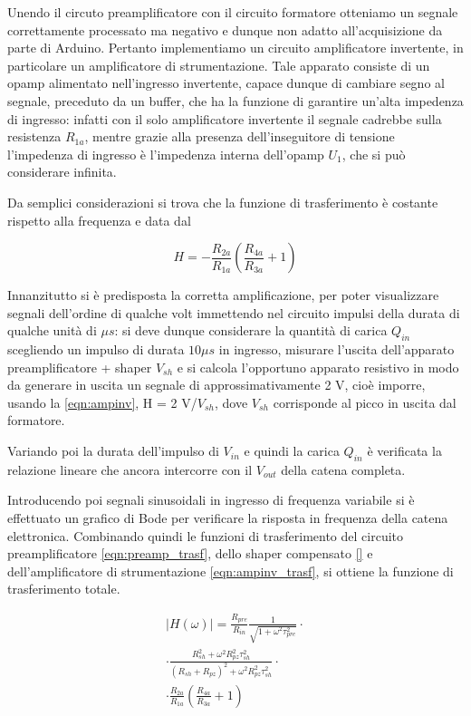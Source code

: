 \documentclass{article}
\begin{document}
Unendo il circuto preamplificatore con il circuito formatore otteniamo un segnale correttamente processato ma negativo e dunque non
adatto all'acquisizione da parte di Arduino. Pertanto implementiamo un circuito amplificatore invertente, in particolare un
amplificatore di strumentazione. Tale apparato consiste di un opamp alimentato nell'ingresso invertente, capace dunque di cambiare
segno al segnale, preceduto da un buffer, che ha la funzione di garantire un'alta impedenza di ingresso: infatti con il solo 
amplificatore invertente il segnale cadrebbe sulla resistenza $R_{1a}$, mentre grazie alla presenza dell'inseguitore di tensione 
l'impedenza di ingresso è l'impedenza interna dell'opamp $U_1$, che si può considerare infinita.

Da semplici considerazioni si trova che la funzione di trasferimento è costante rispetto alla frequenza e data dal

\begin{equation}
    \label{eqn:ampinv_trasf}
    H = - \frac{R_{2a}}{R_{1a}} \left( \frac{R_{4a}}{R_{3a}} + 1 \right)
\end{equation}

Innanzitutto si è predisposta la corretta amplificazione, per poter visualizzare segnali dell'ordine di qualche volt immettendo
nel circuito impulsi della durata di qualche unità di $\mu s$: si deve dunque considerare la quantità di carica $Q_{in}$ 
scegliendo un impulso di durata $10 \mu s$ in ingresso, misurare l'uscita dell'apparato preamplificatore + shaper $V_{sh}$ 
e si calcola l'opportuno apparato resistivo in modo da generare in uscita un segnale di approssimativamente 2 V, cioè imporre, usando
la \ref{eqn:ampinv}, H = 2 V/$V_{sh}$, dove $V_{sh}$ corrisponde al picco in uscita dal formatore.

Variando poi la durata dell'impulso di $V_{in}$ e quindi la carica $Q_{in}$ è verificata la relazione lineare che ancora
intercorre con il $V_{out}$ della catena completa.

Introducendo poi segnali sinusoidali in ingresso di frequenza variabile si è effettuato un grafico di Bode per verificare la risposta
in frequenza della catena elettronica. Combinando quindi le funzioni di trasferimento del circuito preamplificatore 
\ref{eqn:preamp_trasf}, dello shaper compensato \ref{} e dell'amplificatore di strumentazione 
\ref{eqn:ampinv_trasf}, si ottiene la funzione di trasferimento totale.

\begin{multline}
    \label{eqn:catena_trasf}
    |H(\omega)| = \frac{R_{pre}}{R_{in}} \frac{1}{\sqrt{1+\omega^2\tau_{pre}^2}} \cdot \\
    \cdot \frac{R_{sh}^2 + \omega^2 R_{pz}^2 \tau_{sh}^2}{(R_{sh}+R_{pz})^2 + \omega^2 R_{pz}^2 \tau_{sh}^2} \cdot \\
    \cdot \frac{R_{2a}}{R_{1a}} \left( \frac{R_{4a}}{R_{3a}} + 1 \right)
\end{multline}
\end{document}
